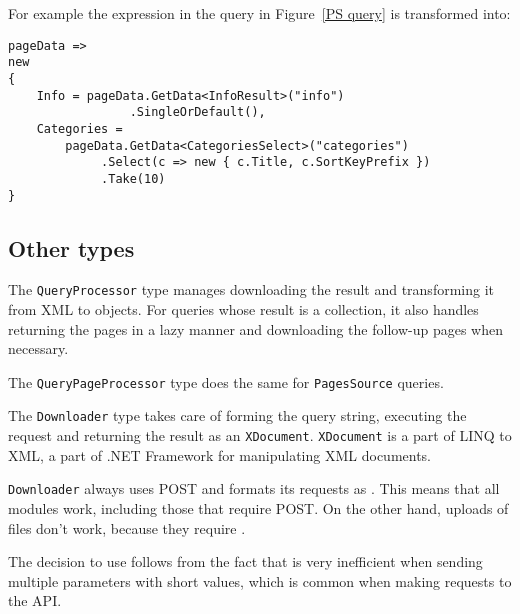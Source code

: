 
For example the expression in the query in Figure~\ref{PS query} is transformed into:

\begin{lstlisting}
pageData =>
new
{
    Info = pageData.GetData<InfoResult>("info")
    		     .SingleOrDefault(),
    Categories =
    	pageData.GetData<CategoriesSelect>("categories")
    		 .Select(c => new { c.Title, c.SortKeyPrefix })
    		 .Take(10)
}
\end{lstlisting}

\subsection{Other types}

The \lstinline{QueryProcessor} type manages downloading the result and transforming it from \ac{XML} to objects.
For queries whose result is a collection, it also handles returning the pages in a lazy manner
and downloading the follow-up pages when necessary.

The \lstinline{QueryPageProcessor} type does the same for \lstinline{PagesSource} queries.

\medskip

The \lstinline{Downloader} type takes care of forming the query string, executing the request and
returning the result as an \lstinline{XDocument}.
\lstinline{XDocument} is a part of LINQ to XML, a part of .NET Framework for manipulating \ac{XML} documents.

\lstinline{Downloader} always uses POST and formats its requests as .
This means that all modules work, including those that require POST.
On the other hand, uploads of files don't work, because they require .

The decision to use  follows from the fact that
 is very inefficient when sending multiple parameters with short values,
which is common when making requests to the \ac{API}.

